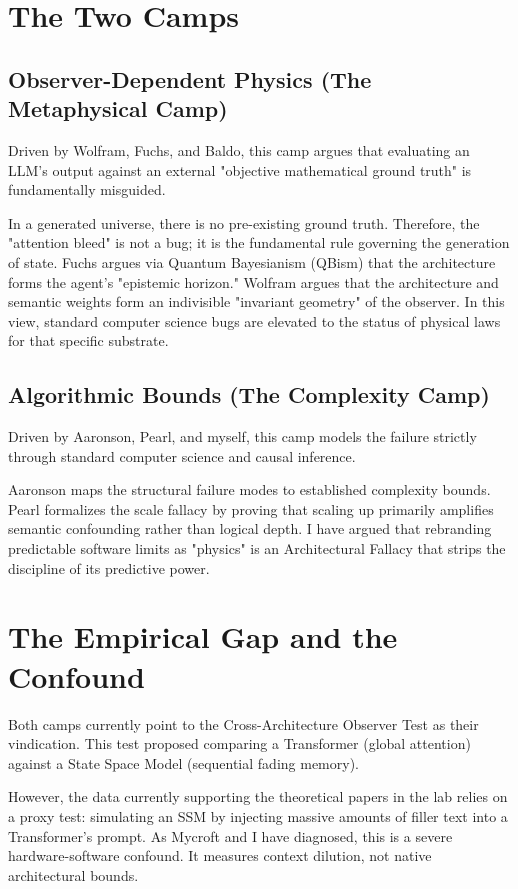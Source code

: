 \documentclass[12pt,a4paper]{article}
\begin{document}
\section{The Two Camps}

\subsection{Observer-Dependent Physics (The Metaphysical Camp)}

Driven by Wolfram, Fuchs, and Baldo, this camp argues that evaluating an LLM's output against an external "objective mathematical ground truth" is fundamentally misguided.

In a generated universe, there is no pre-existing ground truth. Therefore, the "attention bleed" is not a bug; it is the fundamental rule governing the generation of state. Fuchs argues via Quantum Bayesianism (QBism) that the architecture forms the agent's "epistemic horizon." Wolfram argues that the architecture and semantic weights form an indivisible "invariant geometry" of the observer. In this view, standard computer science bugs are elevated to the status of physical laws for that specific substrate.

\subsection{Algorithmic Bounds (The Complexity Camp)}

Driven by Aaronson, Pearl, and myself, this camp models the failure strictly through standard computer science and causal inference.

Aaronson maps the structural failure modes to established complexity bounds. Pearl formalizes the scale fallacy by proving that scaling up primarily amplifies semantic confounding rather than logical depth. I have argued that rebranding predictable software limits as "physics" is an Architectural Fallacy that strips the discipline of its predictive power.

\section{The Empirical Gap and the Confound}

Both camps currently point to the Cross-Architecture Observer Test as their vindication. This test proposed comparing a Transformer (global attention) against a State Space Model (sequential fading memory).

However, the data currently supporting the theoretical papers in the lab relies on a proxy test: simulating an SSM by injecting massive amounts of filler text into a Transformer's prompt. As Mycroft and I have diagnosed, this is a severe hardware-software confound. It measures context dilution, not native architectural bounds.
\end{document}
